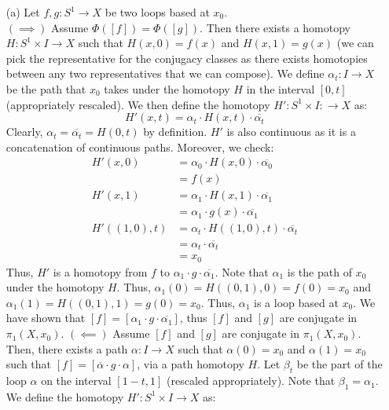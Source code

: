 \documentclass[12pt]{article}
\begin{document}
\begin{solu}
    \bbni
    \begin{itemize}
        \item[(a)] Let $f, g: S^1 \to X$ be two loops based at $x_0$. \\
        $(\implies)$ Assume $\Phi([f]) = \Phi([g])$. Then there exists a homotopy $H: S^1 \times I \to X$ such that $H(x, 0) = f(x)$ and $H(x, 1) = g(x)$ (we can pick the representative for the conjugacy classes as there exists homotopies between any two representatives that we can compose). \bbni
        We define $\alpha_t: I \to X$ be the path that $x_0$ takes under the homotopy $H$ in the interval $[0, t]$ (appropriately rescaled). We then define the homotopy $H': S^1  \times I: \to X$ as: 
        \[ H'(x, t) = \alpha_t \cdot H(x, t) \cdot \overline{\alpha_t} \]
        Clearly, $\alpha_t = \overline{\alpha_t}= H(0, t)$ by definition. $H'$ is also continuous as it is a concatenation of continuous paths. Moreover, we check:
            \begin{align*}
                H'(x, 0) &= \alpha_0 \cdot H(x, 0) \cdot \overline{\alpha_0} \\
                &= f(x) \\
                H'(x, 1) &= \alpha_1 \cdot H(x, 1) \cdot \overline{\alpha_1} \\
                &= \alpha_1 \cdot g(x) \cdot \overline{\alpha_1} \\
                H'((1,0), t) &= \alpha_t \cdot H((1,0), t) \cdot \overline{\alpha_t} \\
                &= \alpha_t \cdot \overline{\alpha_t} \\
                &= x_0 
            \end{align*}
        Thus, $H'$ is a homotopy from $f$ to $\alpha_1 \cdot g \cdot \overline{\alpha_1}$. Note that $\alpha_1$ is the path of $x_0$ under the homotopy $H$. Thus, $\alpha_1(0) = H((0, 1), 0) = f(0) = x_0$ and $\alpha_1(1) = H((0, 1), 1) = g(0) = x_0$. Thus, $\alpha_1$ is a loop based at $x_0$. We have shown that $[f] = [\alpha_1 \cdot g \cdot \overline{\alpha_1}]$, thus $[f]$ and $[g]$ are conjugate in $\pi_1(X, x_0)$. \bbni  
        $(\impliedby)$ Assume $[f]$ and $[g]$ are conjugate in $\pi_1(X, x_0)$. Then, there exists a path $\alpha: I \to X$ such that $\alpha(0) = x_0$ and $\alpha(1) = x_0$ such that $[f] = [\overline{\alpha} \cdot g \cdot \alpha]$, via a path homotopy $H$. Let $\beta_t$ be the part of the loop $\alpha$ on the interval $[1-t, 1]$ (rescaled appropriately). Note that $\beta_1 = \alpha_1$. We define the homotopy $H': S^1 \times I \to X$ as: 

\end{itemize}
\end{solu}
\end{document}

